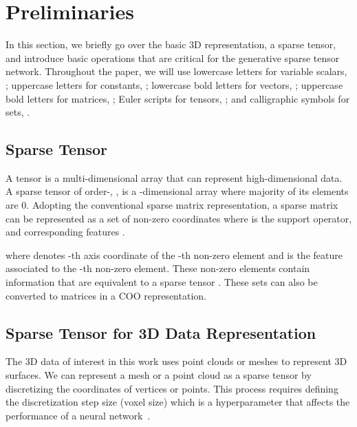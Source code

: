 \documentclass[runningheads]{llncs}
\begin{document}
%
 \section{Preliminaries}

In this section, we briefly go over the basic 3D representation, a sparse tensor, and introduce basic operations that are critical for the generative sparse tensor network. Throughout the paper, we will use lowercase letters for variable scalars, ; uppercase letters for constants, ; lowercase bold letters for vectors, ; uppercase bold letters for matrices, ; Euler scripts for tensors, ; and calligraphic symbols for sets, .



 
\subsection{Sparse Tensor}

A tensor is a multi-dimensional array that can represent high-dimensional data. A sparse tensor of order-, , is a -dimensional array where majority of its elements are 0. Adopting the conventional sparse matrix representation, a sparse matrix can be represented as a set of non-zero coordinates  where  is the support operator, and corresponding features .

where  denotes -th axis coordinate of the -th non-zero element and  is the feature associated to the -th non-zero element. These non-zero elements contain information that are equivalent to a sparse tensor . These sets can also be converted to matrices  in a COO representation.











\subsection{Sparse Tensor for 3D Data Representation}

The 3D data of interest in this work uses point clouds or meshes to represent 3D surfaces. We can represent a mesh or a point cloud as a sparse tensor by discretizing the coordinates of vertices or points. This process requires defining the discretization step size (voxel size) which is a hyperparameter that affects the performance of a neural network~\cite{FCGF2019,minkowskinet}. 
\end{document}
